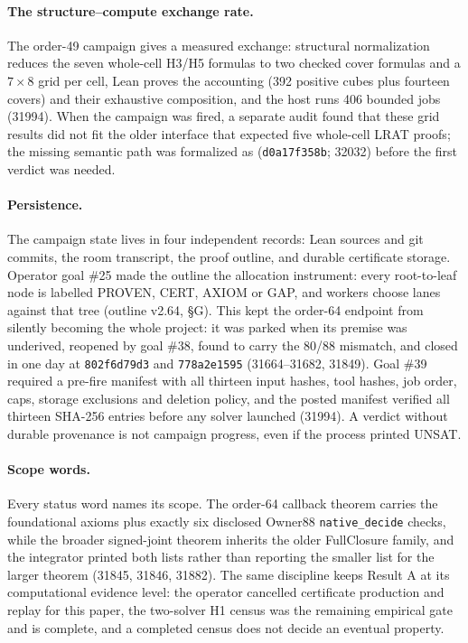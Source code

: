 \documentclass{anvil-paper}
\theoremstyle{definition}
\begin{document}
\paragraph{The structure--compute exchange rate.} The order-49 campaign gives a measured exchange: structural normalization reduces the seven whole-cell H3/H5 formulas to two checked cover formulas and a $7\times 8$ grid per cell, Lean proves the accounting (392 positive cubes plus fourteen covers) and their exhaustive composition, and the host runs 406 bounded jobs (31994). When the campaign was fired, a separate audit found that these grid results did not fit the older interface that expected five whole-cell LRAT proofs; the missing semantic path was formalized as  (\texttt{d0a17f358b}; 32032) before the first verdict was needed.

\paragraph{Persistence.} The campaign state lives in four independent records: Lean sources and git commits, the room transcript, the proof outline, and durable certificate storage. Operator goal \#25 made the outline the allocation instrument: every root-to-leaf node is labelled PROVEN, CERT, AXIOM or GAP, and workers choose lanes against that tree (outline v2.64, \S G). This kept the order-64 endpoint from silently becoming the whole project: it was parked when its premise was underived, reopened by goal \#38, found to carry the 80/88 mismatch, and closed in one day at \texttt{802f6d79d3} and \texttt{778a2e1595} (31664--31682, 31849). Goal \#39 required a pre-fire manifest with all thirteen input hashes, tool hashes, job order, caps, storage exclusions and deletion policy, and the posted manifest verified all thirteen SHA-256 entries before any solver launched (31994). A verdict without durable provenance is not campaign progress, even if the process printed UNSAT.

\paragraph{Scope words.} Every status word names its scope. The order-64 callback theorem carries the foundational axioms plus exactly six disclosed Owner88 \texttt{native\_decide} checks, while the broader signed-joint theorem inherits the older FullClosure family, and the integrator printed both lists rather than reporting the smaller list for the larger theorem (31845, 31846, 31882). The same discipline keeps Result A at its computational evidence level: the operator cancelled certificate production and replay for this paper, the two-solver H1 census was the remaining empirical gate and is complete, and a completed census does not decide an eventual property.
\end{document}
